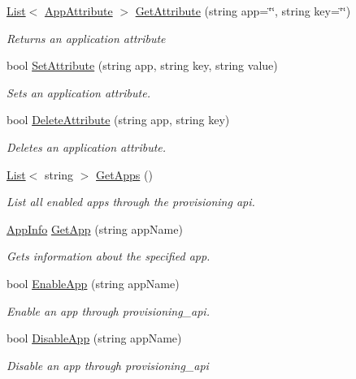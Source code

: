 \begin{DoxyCompactItemize}
\hyperlink{classowncloudsharp_1_1_client_a914c144ebbe207958829523f7eda3609}{List}$<$ \hyperlink{classowncloudsharp_1_1_types_1_1_app_attribute}{App\+Attribute} $>$ \hyperlink{classowncloudsharp_1_1_client_a8f843f60b178973e988c0edabef26c49}{Get\+Attribute} (string app=\char`\"{}\char`\"{}, string key=\char`\"{}\char`\"{})
\begin{DoxyCompactList}\small\item\em Returns an application attribute \end{DoxyCompactList}\item 
bool \hyperlink{classowncloudsharp_1_1_client_a0939782439f44c5250d66147755d4c25}{Set\+Attribute} (string app, string key, string value)
\begin{DoxyCompactList}\small\item\em Sets an application attribute. \end{DoxyCompactList}\item 
bool \hyperlink{classowncloudsharp_1_1_client_ad94e83b297c9de310beafd878fd99bc4}{Delete\+Attribute} (string app, string key)
\begin{DoxyCompactList}\small\item\em Deletes an application attribute. \end{DoxyCompactList}\item 
\hyperlink{classowncloudsharp_1_1_client_a914c144ebbe207958829523f7eda3609}{List}$<$ string $>$ \hyperlink{classowncloudsharp_1_1_client_a52851315d9d1273b6f674baafe3a5840}{Get\+Apps} ()
\begin{DoxyCompactList}\small\item\em List all enabled apps through the provisioning api. \end{DoxyCompactList}\item 
\hyperlink{classowncloudsharp_1_1_types_1_1_app_info}{App\+Info} \hyperlink{classowncloudsharp_1_1_client_a55a02342fcec4161abe9c5798c36dabf}{Get\+App} (string app\+Name)
\begin{DoxyCompactList}\small\item\em Gets information about the specified app. \end{DoxyCompactList}\item 
bool \hyperlink{classowncloudsharp_1_1_client_a4023a60f6fa18288d4b9cf8cba705e7c}{Enable\+App} (string app\+Name)
\begin{DoxyCompactList}\small\item\em Enable an app through provisioning\+\_\+api. \end{DoxyCompactList}\item 
bool \hyperlink{classowncloudsharp_1_1_client_a77306ba08609c9cf128e62b955227648}{Disable\+App} (string app\+Name)
\begin{DoxyCompactList}\small\item\em Disable an app through provisioning\+\_\+api \end{DoxyCompactList}\end{DoxyCompactItemize}
